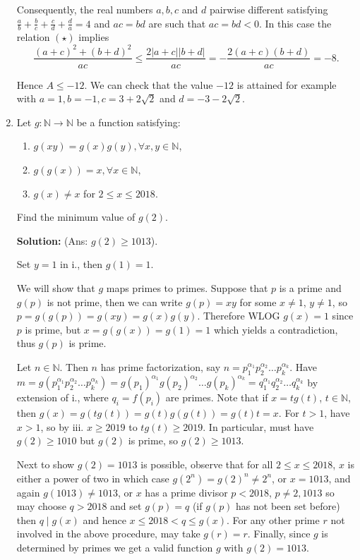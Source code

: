 \documentclass{article}
\newcommand{\solution}[1]{%
\ifsolutions%
    \textbf{Solution: } #1
\fi
}
\begin{document}
\begin{enumerate}
{Consequently, the real numbers $a, b, c$ and $d$ pairwise different satisfying $\frac{a}{b} + \frac{b}{c} + \frac{c}{d} + \frac{d}{a} = 4$ and $ac = bd$ are such that $ac = bd < 0$. In this case the relation $(\star)$ implies
\[
    \frac{{(a + c)}^2 + {(b + d)}^2}{ac} \leq \frac{2 |a + c| |b + d|}{ac} = - \frac{2(a + c)(b + d)}{ac} = -8.
\]

Hence $A \leq -12$. We can check that the value $-12$ is attained for example with $a = 1, b = -1, c = 3 + 2 \sqrt{2}$ and $d = -3 - 2 \sqrt{2}$.}

\item Let $g : \mathbb{N} \to \mathbb{N}$ be a function satisfying:
\begin{enumerate}
    \item $g(xy) = g(x)g(y), \forall x, y \in \mathbb{N}$,
    \item $g(g(x)) = x, \forall x \in \mathbb{N}$,
    \item $g(x) \neq x$ for $2 \leq x \leq 2018$.
\end{enumerate}

Find the minimum value of $g(2)$.

\solution{(Ans: $g(2) \geq 1013$).

Set $y = 1$ in i., then $g(1) = 1$.

We will show that $g$ maps primes to primes. Suppose that $p$ is a prime and $g(p)$ is not prime, then we can write $g(p) = xy$ for some $x \neq 1$, $y \neq 1$, so $p = g(g(p)) = g(xy) = g(x) g(y)$. Therefore WLOG $g(x) = 1$ since $p$ is prime, but $x = g(g(x)) = g(1) = 1$ which yields a contradiction, thus $g(p)$ is prime.

Let $n \in \mathbb{N}$. Then $n$ has prime factorization, say $n = p_1^{\alpha_1} p_2^{\alpha_2} \dots p_k^{\alpha_k}$. Have $m = g(p_1^{\alpha_1} p_2^{\alpha_2} \dots p_k^{\alpha_k}) = {g(p_1)}^{\alpha_1} {g(p_2)}^{\alpha_2} \dots {g(p_k)}^{\alpha_k} = q_1^{\alpha_1} q_2^{\alpha_2} \dots q_k^{\alpha_k}$ by extension of i., where $q_i = f(p_i)$ are primes. Note that if $x = tg(t)$, $t \in \mathbb{N}$, then $g(x) = g(tg(t)) = g(t) g(g(t)) = g(t) t = x$. For $t > 1$, have $x > 1$, so by iii. $x \geq 2019$ to $tg(t) \geq 2019$. In particular, must have $g(2) \geq 1010$ but $g(2)$ is prime, so $g(2) \geq 1013$.

Next to show $g(2) = 1013$ is possible, observe that for all $2 \leq x \leq 2018$, $x$ is either a power of two in which case $g(2^n) = {g(2)}^n \neq 2^n$, or $x = 1013$, and again $g(1013) \neq 1013$, or $x$ has a prime divisor $p < 2018$, $p \neq 2, 1013$ so may choose $q > 2018$ and set $g(p) = q$ (if $g(p)$ has not been set before) then $q \mid g(x)$ and hence $x \leq 2018 < q \leq g(x)$. For any other prime $r$ not involved in the above procedure, may take $g(r) = r$. Finally, since $g$ is determined by primes we get a valid function $g$ with $g(2) = 1013$.}


\end{enumerate}
\end{document}
